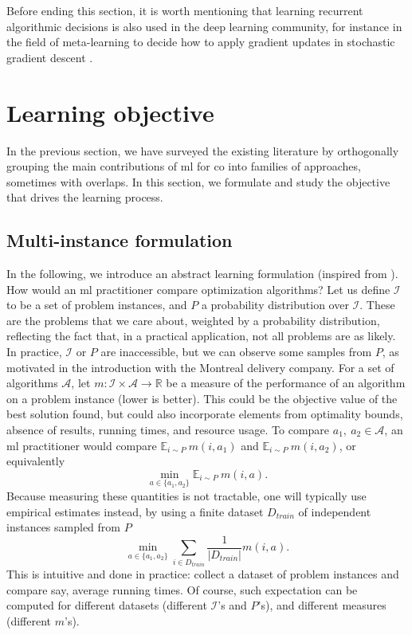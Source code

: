 \documentclass[11pt]{article}
\begin{document}
		Before ending this section, it is worth mentioning that learning recurrent algorithmic decisions is
		also used in the deep learning community, for instance in the field of meta-learning to decide how
		to apply gradient updates in stochastic gradient descent
		\citep{AndrychowiczLearninglearngradient2016, LiLearningOptimizeNeural2017,
		WichrowskaLearnedOptimizersthat2017}.

\section{Learning objective}
	\label{sec:learning_objective}

	In the previous section, we have surveyed the existing literature by orthogonally grouping the main
	contributions of \gls{ml} for \gls{co} into families of approaches, sometimes with overlaps.
	In this section, we formulate and study the objective that drives the learning process.

	\subsection{Multi-instance formulation}
		\label{sec:formulation}
		In the following, we introduce an abstract learning formulation (inspired from
		\cite{BischlAslib2016}).
		How would an \gls{ml} practitioner compare optimization algorithms?
		Let us define $\mathcal{I}$ to be a set of problem instances, and $P$ a probability distribution
		over $\mathcal{I}$.
		These are the problems that we care about, weighted by a probability distribution, reflecting the
		fact that, in a practical application, not all problems are as likely.
		In practice, $\mathcal{I}$ or $P$ are inaccessible, but we can observe some samples from $P$, as motivated in
		the introduction with the Montreal delivery company.
		For a set of algorithms $\mathcal{A}$, let $m: \mathcal{I} \times \mathcal{A} \rightarrow
		\mathbb{R}$ be a measure of the performance of an algorithm on a problem instance (lower is better).
		This could be the objective value of the best solution found, but could also incorporate
		elements from optimality bounds, absence of results, running times, and resource usage.
		To compare $a_{1},\ a_2 \in \mathcal{A}$, an \gls{ml} practitioner would compare $\mathbb{E}_{i \sim
				P}\ m(i, a_1)$ and $\mathbb{E}_{i \sim P}\ m(i, a_2)$, or equivalently
		\begin{equation}
			\label{eq:model_comparison}
			\min_{a \in \{a_1, a_2\}} \mathbb{E}_{i \sim P}\ m(i, a).
		\end{equation}
		Because measuring these quantities is not tractable, one will typically use empirical
		estimates instead, by using a finite dataset $D_{train}$ of independent instances
		sampled from $P$
		\begin{equation}
		    \label{eq:model_comparison_empirical}
			\min_{a \in \{a_1, a_2\}} \sum_{i \in D_{train}} \frac{1}{|D_{train}|} m(i, a).
		\end{equation}
		This is intuitive and done in practice: collect a dataset of problem instances and compare say,
		average running times.
		Of course, such expectation can be computed for different datasets (different
		$\mathcal{I}$'s and $P$'s), and different measures (different $m$'s).
\end{document}
